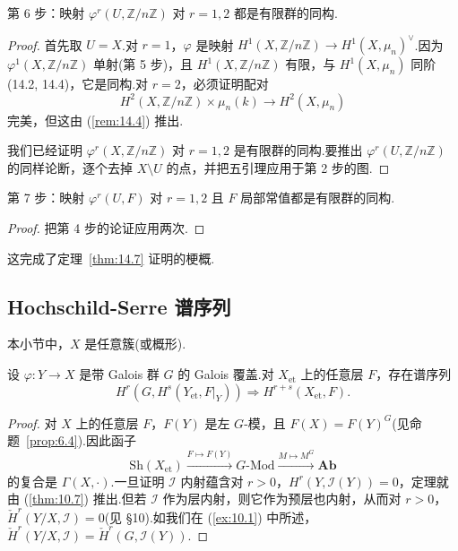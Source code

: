第 6 步：映射 $\varphi^{r}(U, \mathbb{Z}/n\mathbb{Z})$ 对 $r = 1, 2$ 都是有限群的同构.

\begin{proof}
首先取 $U = X$.对 $r = 1$，$\varphi$ 是映射 $H^{1}(X, \mathbb{Z}/n\mathbb{Z}) \to H^{1}(X, \mu_n)^{\vee}$.因为 $\varphi^{1}(X, \mathbb{Z}/n\mathbb{Z})$ 单射(第 5 步)，且 $H^{1}(X, \mathbb{Z}/n\mathbb{Z})$ 有限，与 $H^{1}(X, \mu_n)$ 同阶(14.2, 14.4)，它是同构.对 $r = 2$，必须证明配对
\[
H^{2}(X, \mathbb{Z}/n\mathbb{Z}) \times \mu_n(k) \to H^{2}(X, \mu_n)
\]
完美，但这由 (\ref{rem:14.4}) 推出.

我们已经证明 $\varphi^{r}(X, \mathbb{Z}/n\mathbb{Z})$ 对 $r = 1, 2$ 是有限群的同构.要推出 $\varphi^{r}(U, \mathbb{Z}/n\mathbb{Z})$ 的同样论断，逐个去掉 $X \setminus U$ 的点，并把五引理应用于第 2 步的图.
\end{proof}

第 7 步：映射 $\varphi^{r}(U, F)$ 对 $r = 1, 2$ 且 $F$ 局部常值都是有限群的同构.

\begin{proof}
把第 4 步的论证应用两次.
\end{proof}

这完成了定理~\ref{thm:14.7} 证明的梗概.

\subsection*{Hochschild-Serre 谱序列}

本小节中，$X$ 是任意簇(或概形).

\begin{theorem}\label{thm:14.9}
设 $\varphi \colon Y \to X$ 是带 Galois 群 $G$ 的 Galois 覆盖.对 $X_{\mathrm{et}}$ 上的任意层 $F$，存在谱序列
\begin{equation}
H^{r}(G, H^{s}(Y_{\mathrm{et}}, F|_{Y})) \Rightarrow H^{r+s}(X_{\mathrm{et}}, F). \tag{1}
\end{equation}
\end{theorem}

\begin{proof}
对 $X$ 上的任意层 $F$，$F(Y)$ 是左 $G$-模，且 $F(X) = F(Y)^{G}$(见命题~\ref{prop:6.4}).因此函子
\[
\mathrm{Sh}(X_{\mathrm{et}}) \xrightarrow{F \mapsto F(Y)} G\text{-}\mathrm{Mod} \xrightarrow{M \mapsto M^{G}} \mathbf{Ab}
\]
的复合是 $\Gamma(X, \cdot)$.一旦证明 $\mathcal{I}$ 内射蕴含对 $r > 0$，$H^{r}(Y, \mathcal{I}(Y)) = 0$，定理就由 (\ref{thm:10.7}) 推出.但若 $\mathcal{I}$ 作为层内射，则它作为预层也内射，从而对 $r > 0$，$\check{H}^{r}(Y/X, \mathcal{I}) = 0$(见 \S 10).如我们在 (\ref{ex:10.1}) 中所述，$\check{H}^{r}(Y/X, \mathcal{I}) = \check{H}^{r}(G, \mathcal{I}(Y))$.
\end{proof}

